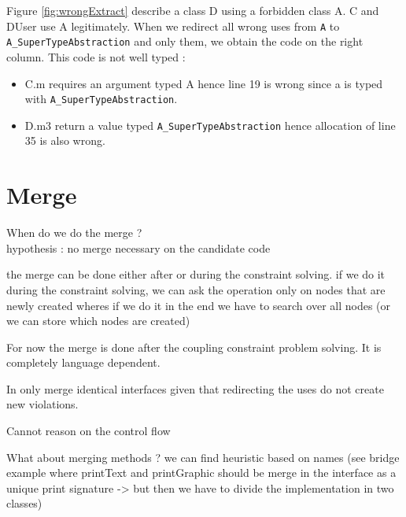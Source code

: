 \documentclass[]{article}
\begin{document}
Figure \ref{fig:wrongExtract} describe a class D using a forbidden class A. C and DUser use A legitimately. When we redirect all wrong uses from \texttt{A} to \texttt{A\_SuperTypeAbstraction} and only them, we obtain the code on the right column.
This code is not well typed : 

\begin{itemize}
\item C.m requires an argument typed A hence line 19 is wrong since a is typed with \texttt{A\_SuperTypeAbstraction}.
\item D.m3 return a value typed \texttt{A\_SuperTypeAbstraction} hence allocation of line 35 is also wrong. 
\end{itemize}


\section{Merge}

When do we do the merge ?\\
hypothesis : no merge necessary on the candidate code

the merge can be done either after or during the constraint solving.
if we do it during the constraint solving, we can ask the operation only on nodes that are newly created wheres if we do it in the end we have to search over all nodes (or we can store which nodes are created)


For now the merge is done after the coupling constraint problem solving. It is completely language dependent.

In only merge identical interfaces given that redirecting the uses do not create new violations.

Cannot reason on the control flow 

What about merging methods ?  we can find heuristic based on names (see bridge example where printText and printGraphic should be merge in the interface as a unique print signature -> but then we have to divide the implementation in two classes)
\end{document}
